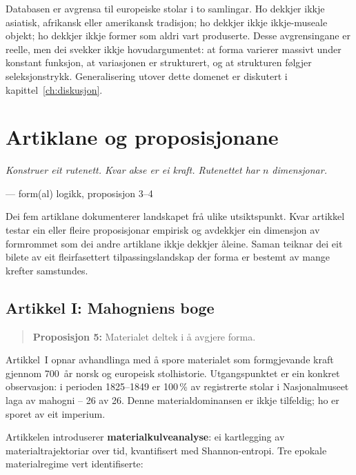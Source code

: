 \documentclass[12pt,a4paper,oneside]{report}
\begin{document}
Databasen er avgrensa til europeiske stolar i to samlingar. Ho dekkjer ikkje asiatisk, afrikansk eller amerikansk tradisjon; ho dekkjer ikkje ikkje-museale objekt; ho dekkjer ikkje former som aldri vart produserte. Desse avgrensingane er reelle, men dei svekker ikkje hovudargumentet: at forma varierer massivt under konstant funksjon, at variasjonen er strukturert, og at strukturen følgjer seleksjonstrykk. Generalisering utover dette domenet er diskutert i kapittel~\ref{ch:diskusjon}.

\chapter{Artiklane og proposisjonane}
\label{ch:artiklane}

\epigraph{\itshape Konstruer eit rutenett. Kvar akse er ei kraft. Rutenettet har $n$ dimensjonar.}{--- form(al) logikk, proposisjon 3--4}

Dei fem artiklane dokumenterer landskapet frå ulike utsiktspunkt. Kvar artikkel testar ein eller fleire proposisjonar empirisk og avdekkjer ein dimensjon av formrommet som dei andre artiklane ikkje dekkjer åleine. Saman teiknar dei eit bilete av eit fleirfasettert tilpassingslandskap der forma er bestemt av mange krefter samstundes.

\section{Artikkel I: Mahogniens boge}
\label{sec:art1}

\begin{quote}
\textbf{Proposisjon 5:} Materialet deltek i å avgjere forma.
\end{quote}

Artikkel~I opnar avhandlinga med å spore materialet som formgjevande kraft gjennom 700~år norsk og europeisk stolhistorie. Utgangspunktet er ein konkret observasjon: i perioden 1825--1849 er 100\,\% av registrerte stolar i Nasjonalmuseet laga av mahogni -- 26 av 26. Denne materialdominansen er ikkje tilfeldig; ho er sporet av eit imperium.

Artikkelen introduserer \textbf{materialkulveanalyse}: ei kartlegging av materialtrajektoriar over tid, kvantifisert med Shannon-entropi. Tre epokale materialregime vert identifiserte:
\end{document}
